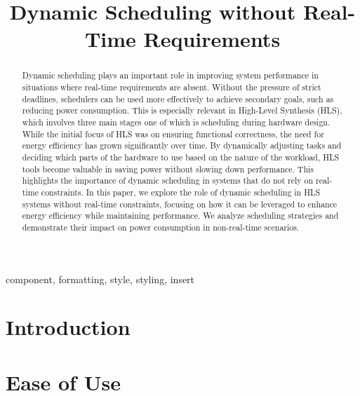 \documentclass[conference]{IEEEtran}
\begin{document}
\title{ Dynamic Scheduling without Real-Time Requirements\\

}

\author{

}

\maketitle

\begin{abstract}
Dynamic scheduling plays an important role in improving system performance in situations where real-time requirements are absent. Without the pressure of strict deadlines, schedulers can be used more effectively to achieve secondary goals, such as reducing power consumption. This is especially relevant in High-Level Synthesis (HLS), which involves three main stages  one of which is scheduling during hardware design. While the initial focus of HLS was on ensuring functional correctness, the need for energy efficiency has grown significantly over time. By dynamically adjusting tasks and deciding which parts of the hardware to use based on the nature of the workload, HLS tools become valuable in saving power without slowing down performance. This highlights the importance of dynamic scheduling in systems that do not rely on real-time constraints.
 In this paper, we explore the role of dynamic scheduling in HLS systems without real-time constraints, focusing on how it can be leveraged to enhance energy efficiency while maintaining performance. We analyze scheduling strategies and demonstrate their impact on power consumption in non-real-time scenarios. 
\end{abstract}

\begin{IEEEkeywords}
component, formatting, style, styling, insert
\end{IEEEkeywords}

\section{Introduction}
 

\section{Ease of Use}
\end{document}
